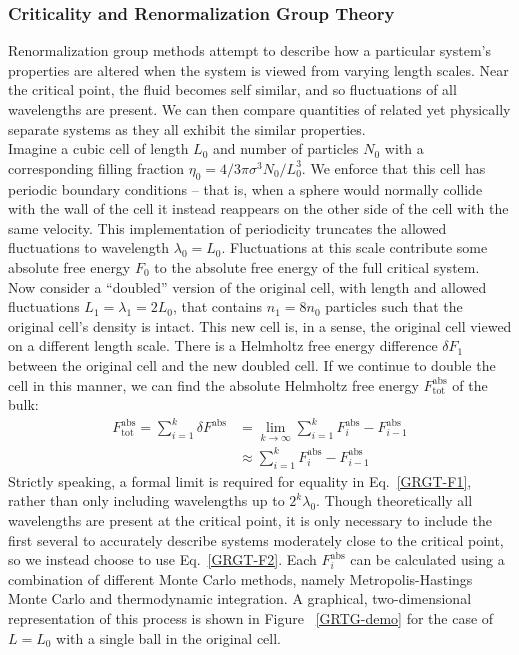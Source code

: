 \documentclass[12pt]{article}
\begin{document}
\subsubsection{Criticality and Renormalization Group Theory}
Renormalization group methods attempt to describe how a particular system's properties are altered when the system is viewed from varying length scales. Near the critical point, the fluid becomes self similar, and so fluctuations of all wavelengths are present. We can then compare quantities of related yet physically separate systems as they all exhibit the similar properties.\\

Imagine a cubic cell of length $L_0$ and number of particles $N_0$ with a corresponding filling fraction $\eta_0 = 4/3\pi\sigma^3N_0/L_0^3$. We enforce that this cell has periodic boundary conditions -- that is, when a sphere would normally collide with the wall of the cell it instead reappears on the other side of the cell with the same velocity. This implementation of periodicity truncates the allowed fluctuations to wavelength $\lambda_0 = L_0$. Fluctuations at this scale contribute some absolute free energy $F_0$ to the absolute free energy of the full critical system. \\

Now consider a ``doubled'' version of the original cell, with length and allowed fluctuations $L_1 = \lambda_1 = 2L_0$, that contains $n_1 = 8n_0$ particles such that the original cell's density is intact. This new cell is, in a sense, the original cell viewed on a different length scale. There is a Helmholtz free energy difference $\delta F_1$ between the original cell and the new doubled cell. If we continue to double the cell in this manner, we can find the absolute Helmholtz free energy $F^{\text{abs}}_{\text{tot}}$ of the bulk:   
\begin{align}
    \label{GRGT-F1}
    F^{\text{abs}}_{\text{tot}} = \sum_{i=1}^{k}\delta F^{\text{abs}} &= \lim_{k\to\infty}\sum_{i=1}^{k} F^{\text{abs}}_{i} - F^{\text{abs}}_{i-1}\\
    &\approx \sum_{i=1}^{k} F^{\text{abs}}_{i} - F^{\text{abs}}_{i-1}
    \label{GRGT-F2}
\end{align}
Strictly speaking, a formal limit is required for equality in Eq.~\ref{GRGT-F1}, rather than only including wavelengths up to $2^k\lambda_0$. Though theoretically all wavelengths are present at the critical point, it is only necessary to include the first several to accurately describe systems moderately close to the critical point, so we instead choose to use Eq.~\ref{GRGT-F2}. Each $F^{\text{abs}}_i$ can be calculated using a combination of different Monte Carlo methods, namely Metropolis-Hastings Monte Carlo and thermodynamic integration. A graphical, two-dimensional representation of this process is shown in Figure ~\ref{GRTG-demo} for the case of $L=L_0$ with a single ball in the original cell.\\
\end{document}
